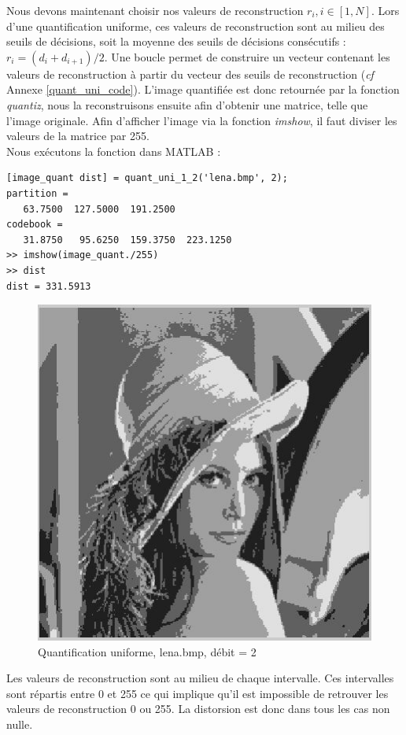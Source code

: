 \documentclass[a4paper, 12pt]{article}
\begin{document}
Nous devons maintenant choisir nos valeurs de reconstruction $r_i, i\in[1, N]$. Lors d'une quantification uniforme, ces valeurs de reconstruction sont au milieu des seuils de décisions, soit la moyenne des seuils de décisions consécutifs : $r_i = (d_i + d_{i+1})/2$. Une boucle permet de construire un vecteur contenant les valeurs de reconstruction à partir du vecteur des seuils de reconstruction (\textit{cf} Annexe \ref{quant_uni_code}). L'image quantifiée est donc retournée par la fonction \textit{quantiz}, nous la reconstruisons ensuite afin d'obtenir une matrice, telle que l'image originale. Afin d'afficher l'image via la fonction \textit{imshow}, il faut diviser les valeurs de la matrice par 255. \\

Nous exécutons la fonction dans MATLAB : 
\begin{verbatim}
[image_quant dist] = quant_uni_1_2('lena.bmp', 2);
partition =
   63.7500  127.5000  191.2500
codebook =
   31.8750   95.6250  159.3750  223.1250
>> imshow(image_quant./255)
>> dist
dist = 331.5913
\end{verbatim}

\begin{figure}[H]
	\centering
		\includegraphics[scale=0.7]{../lena_quant_4_niveaux.jpg}
	\caption{Quantification uniforme, lena.bmp, débit = 2}
	\label{fig:lena_quant_4_niveaux}
\end{figure}

Les valeurs de reconstruction sont au milieu de chaque intervalle. Ces intervalles sont répartis entre 0 et 255 ce qui implique qu'il est impossible de retrouver les valeurs de reconstruction 0 ou 255. La distorsion est donc dans tous les cas non nulle. \\
\end{document}
